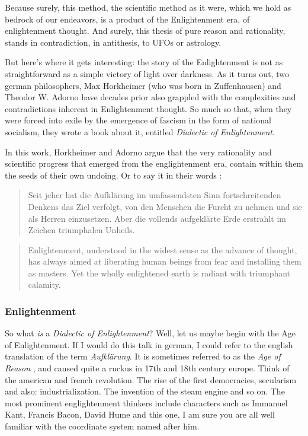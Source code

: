 Because surely, this method, the scientific
method as it were, which we hold as bedrock of our endeavors,
is a product of the Enlightenment era, of enlightenment
thought. And surely, this thesis of pure reason and rationality, stands in
contradiction, in antithesis, to UFOs or astrology.

But here’s where it gets interesting: the story of the Enlightenment is not as
straightforward as a simple victory of light over darkness.  As it turns out,
two german philosophers, Max Horkheimer (who was born in Zuffenhausen) and
Theodor W. Adorno have decades prior also grappled with the complexities and
contradictions inherent in Enlightenment thought. So much so that, when they
were forced into exile by the emergence of fascism in the form of national
socialism, they wrote a book about it, entitled \emph{Dialectic of
Enlightenment}.

In this work, Horkheimer and Adorno argue that the very rationality and
scientific progress that emerged from the englightenment era, contain within
them the seeds of their own undoing. Or to say it in their words
\cite{horkheimerGesammelteSchriftenBand1987,horkheimerDialecticEnlightenmentPhilosophical2002}:
\blockquote{
  Seit jeher hat die Aufkl\"arung im umfassendsten Sinn fortschreitenden Denkens
  das Ziel verfolgt, von den Menschen die Furcht zu nehmen und sie als Herren
  einzusetzen. Aber die vollends aufgekl\"arte Erde erstrahlt im Zeichen
  triumphalen Unheils.
} 
\blockquote{
Enlightenment, understood in the widest sense as the advance of
thought, has always aimed at liberating human beings from fear and
installing them as masters. Yet the wholly enlightened earth is radiant with
triumphant calamity. 
}

\subsubsection*{Enlightenment}
So what \emph{is} a \emph{Dialectic of Enlightenment}? Well, let us maybe begin
with the Age of Enlightenment. If I would do this talk in german, I could refer
to the english translation of the term \emph{Aufklärung}. It is sometimes
referred to as the \emph{Age of Reason} \cite{bristowEnlightenment2023}, and caused
quite a ruckus in 17th and 18th century europe. Think of the american and
french revolution. The rise of the first democracies, secularism and also:
industrialization. The invention of the steam engine and so on.
The most prominent
englightenment thinkers include characters such as Immanuel Kant, Francis
Bacon, David Hume and this one, I am sure you are all well familiar with the
coordinate system named after him.


